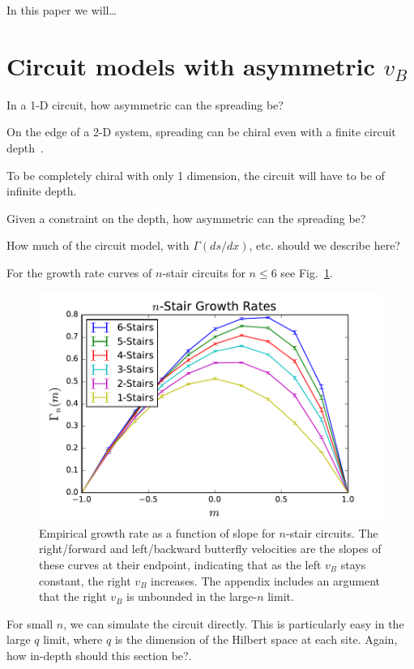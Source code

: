 \documentclass[aps,prl,reprint,superscriptaddress, longbibliography]{revtex4-1}
\newcommand{\charlie}[1]{ {\color{Magenta} {{#1}}}}
\begin{document}
In this paper we will\dots

\pagebreak

\section{Circuit models with asymmetric $v_B$} \label{sec:circ}

In a 1-D circuit, how asymmetric can the spreading be?

On the edge of a 2-D system, spreading can be chiral even with a finite circuit depth~\cite{PoChiralCircuit}.

To be completely chiral with only 1 dimension, the circuit will have to be of infinite depth.

Given a constraint on the depth, how asymmetric can the spreading be?

\charlie{How much of the circuit model, with $\Gamma(ds/dx)$, etc. should we describe here?}

For the growth rate curves of $n$-stair circuits for $n\le 6$ see Fig.~\ref{fig:compareRates}.

\begin{figure}
	\includegraphics[width=\columnwidth]{compareRates.pdf}
	\caption{Empirical growth rate as a function of slope for $n$-stair circuits. The right/forward and left/backward butterfly velocities are the slopes of these curves at their endpoint, indicating that as the left $v_B$ stays constant, the right $v_B$ increases. The appendix includes an argument that the right $v_B$ is unbounded in the large-$n$ limit.}
	\label{fig:compareRates}
\end{figure}	

For small $n$, we can simulate the circuit directly. This is particularly easy in the large $q$ limit, where $q$ is the dimension of the Hilbert space at each site. \charlie{Again, how in-depth should this section be?}.
\end{document}
